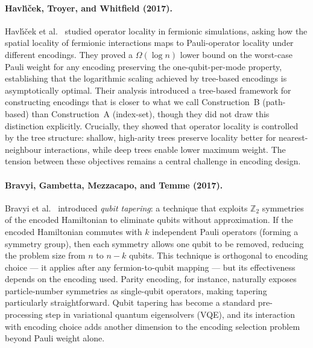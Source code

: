 \paragraph{Havl\'{\i}\v{c}ek, Troyer, and Whitfield (2017).}
Havl\'{\i}\v{c}ek et al.~\cite{havlicek2017} studied operator
locality in fermionic simulations, asking how the spatial locality of
fermionic interactions maps to Pauli-operator locality under different
encodings.  They proved a $\Omega(\log n)$ lower bound on the worst-case
Pauli weight for any encoding preserving the one-qubit-per-mode
property, establishing that the logarithmic scaling achieved by
tree-based encodings is asymptotically optimal.  Their analysis
introduced a tree-based framework for constructing encodings that is
closer to what we call Construction~B (path-based) than
Construction~A (index-set), though they did not draw this distinction
explicitly.  Crucially, they showed that operator locality is
controlled by the tree structure: shallow, high-arity trees preserve
locality better for nearest-neighbour interactions, while deep trees
enable lower maximum weight.  The tension between these objectives
remains a central challenge in encoding design.

\paragraph{Bravyi, Gambetta, Mezzacapo, and Temme (2017).}
Bravyi et al.~\cite{bravyi2017tapering} introduced \emph{qubit
tapering}: a technique that exploits $\mathbb{Z}_2$ symmetries of the
encoded Hamiltonian to eliminate qubits without approximation.  If
the encoded Hamiltonian commutes with $k$ independent Pauli operators
(forming a symmetry group), then each symmetry allows one qubit to be
removed, reducing the problem size from $n$ to $n - k$ qubits.  This
technique is orthogonal to encoding choice --- it applies after any
fermion-to-qubit mapping --- but its effectiveness depends on the
encoding used.  Parity encoding, for instance, naturally exposes
particle-number symmetries as single-qubit operators, making tapering
particularly straightforward.  Qubit tapering has become a standard
pre-processing step in variational quantum eigensolvers (VQE),
and its interaction with encoding choice adds another dimension to
the encoding selection problem beyond Pauli weight alone.

